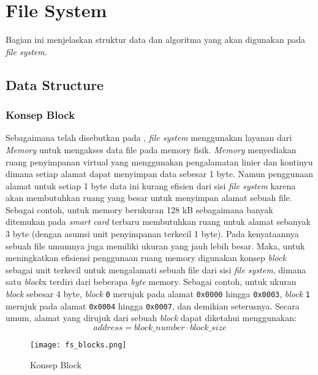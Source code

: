\graphicspath{ {image/} }

\chapter{File System}
\label{design}

Bagian ini menjelaskan struktur data dan algoritma yang akan digunakan pada \emph{file system}.

\section{Data Structure}
\label{data-structure}

\subsection{Konsep Block}
\label{block-concept}

Sebagaimana telah disebutkan pada , \emph{file system} menggunakan layanan dari \emph{Memory} untuk mengakses data file pada memory fisik. \emph{Memory} menyediakan ruang penyimpanan virtual yang menggunakan  pengalamatan linier dan kontinyu dimana setiap alamat dapat menyimpan data sebesar 1 byte. Namun penggunaan alamat untuk setiap 1 byte data ini kurang efisien dari sisi \emph{file system} karena akan membutuhkan ruang yang besar untuk menyimpan alamat sebuah file. Sebagai contoh, untuk memory berukuran 128 kB sebagaimana banyak ditemukan pada \textsl{smart card} terbaru membutuhkan ruang untuk alamat sebanyak 3 byte (dengan asumsi unit penyimpanan terkecil 1 byte). Pada kenyataannya sebuah file umumnya juga memiliki ukuran yang jauh lebih besar. Maka, untuk meningkatkan efisiensi penggunaan ruang memory digunakan konsep \emph{block} sebagai unit terkecil untuk mengalamati sebuah file dari sisi \emph{file system}, dimana satu \emph{block}x terdiri dari beberapa \emph{byte} memory. Sebagai contoh, untuk ukuran \emph{block} sebesar 4 byte, \emph{block} \texttt{0} merujuk pada alamat \texttt{0x0000} hingga \texttt{0x0003}, \emph{block} \texttt{1} merujuk pada alamat \texttt{0x0004} hingga \texttt{0x0007}, dan demikian seterusnya. Secara umum, alamat yang dirujuk dari sebuah \emph{block} dapat diketahui menggunakan:
$$
address=block\_number \cdot block\_size
$$


\begin{figure}[h]
\centering
\texttt{[image: fs\_blocks.png]}
\caption{Konsep Block}
\label{fig-block-concept}
\end{figure}


